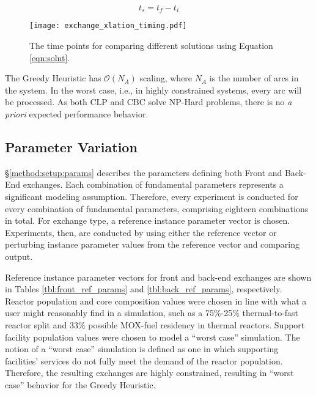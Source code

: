 \begin{equation}\label{eqn:solnt}
t_s = t_f - t_i
\end{equation}

\begin{figure}
  \begin{center}
    \texttt{[image: exchange\_xlation\_timing.pdf]}
    \caption{
      \label{fig:dre_time}
      The time points for comparing different solutions using Equation \ref{eqn:solnt}.}
  \end{center}
\end{figure}

The Greedy Heuristic has $\mathcal{O}(N_A)$ scaling, where $N_A$ is the number
of arcs in the system. In the worst case, i.e., in highly constrained systems,
every arc will be processed. As both CLP and CBC solve NP-Hard problems, there
is no \textit{a priori} expected performance behavior.

\subsection{Parameter Variation}

\S \ref{method:setup:params} describes the parameters defining both Front and
Back-End exchanges. Each combination of fundamental parameters represents a
significant modeling assumption. Therefore, every experiment is conducted for
every combination of fundamental parameters, comprising eighteen combinations in
total. For exchange type, a reference instance parameter vector is
chosen. Experiments, then, are conducted by using either the reference vector or
perturbing instance parameter values from the reference vector and comparing
output.

Reference instance parameter vectors for front and back-end exchanges are shown
in Tables \ref{tbl:front_ref_params} and \ref{tbl:back_ref_params},
respectively. Reactor population and core composition values were chosen in line
with what a user might reasonably find in a simulation, such as a 75\%-25\%
thermal-to-fast reactor split and 33\% possible MOX-fuel residency in thermal
reactors. Support facility population values were chosen to model a ``worst
case'' simulation. The notion of a ``worst case'' simulation is defined as one
in which supporting facilities' services do not fully meet the demand of the
reactor population. Therefore, the resulting exchanges are highly constrained,
resulting in ``worst case'' behavior for the Greedy Heuristic. 

